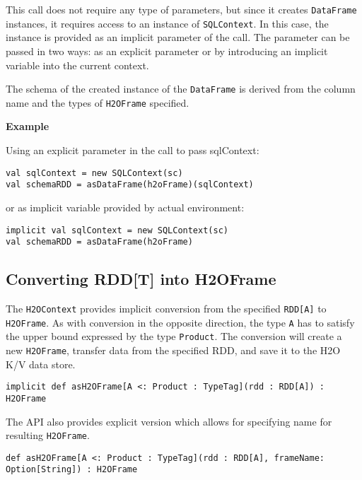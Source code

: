This call does not require any type of parameters, but since it creates \texttt{DataFrame} instances, it requires access to an instance of \texttt{SQLContext}. In this case, the instance is provided as an implicit parameter of the call. The parameter can be passed in two ways: as an explicit parameter or by introducing an implicit variable into the current context.

The schema of the created instance of the \texttt{DataFrame} is derived from the column name and the types of \texttt{H2OFrame} specified.

\textbf{Example}

Using an explicit parameter in the call to pass sqlContext:

\begin{lstlisting}[style=Scala]
val sqlContext = new SQLContext(sc)
val schemaRDD = asDataFrame(h2oFrame)(sqlContext)
\end{lstlisting}

or as implicit variable provided by actual environment:

\begin{lstlisting}[style=Scala]
implicit val sqlContext = new SQLContext(sc)
val schemaRDD = asDataFrame(h2oFrame)
\end{lstlisting}

\subsection{Converting RDD[T] into H2OFrame}

The \texttt{H2OContext} provides implicit conversion from the specified \texttt{RDD[A]} to \texttt{H2OFrame}. As with conversion in the opposite direction, the type \texttt{A} has to satisfy the upper bound expressed by the type \texttt{Product}. The conversion will create a new \texttt{H2OFrame}, transfer data from the specified RDD, and save it to the H2O K/V data store.

\begin{lstlisting}[style=Scala]
implicit def asH2OFrame[A <: Product : TypeTag](rdd : RDD[A]) : H2OFrame
\end{lstlisting}

The API also provides explicit version which allows for specifying name for resulting \texttt{H2OFrame}.

\begin{lstlisting}[style=Scala]
def asH2OFrame[A <: Product : TypeTag](rdd : RDD[A], frameName: Option[String]) : H2OFrame
\end{lstlisting}

